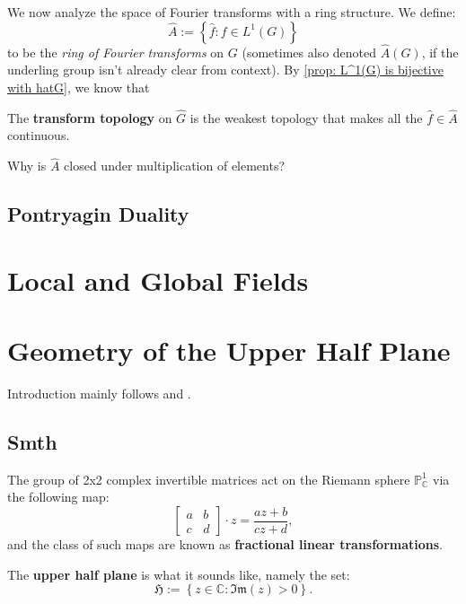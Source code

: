 \documentclass[11pt, x11names, openany]{book}
\newcommand{\cc}{\mathbb{C}}
\newcommand{\bp}{\mathbb{P}}
\newcommand{\frakh}{\mathfrak{H}}
\newcommand{\set}[1]{\left\{ #1 \right\}}
\renewcommand{\hat}{\widehat}
\newcommand{\im}[1]{\mathfrak{Im} \left( #1 \right)}
\begin{document}
We now analyze the space of Fourier transforms with a ring structure. We define:
\begin{equation*}
    \hat{A} := \set{\hat{f} : f \in L^1(G)}
\end{equation*}
to be the \textit{ring of Fourier transforms} on $G$ (sometimes also denoted $\hat{A}(G)$, if the underling group isn't already clear from context). By \ref{prop: L^1(G) is bijective with hatG}, we know that 
\begin{defn}
    The \textbf{transform topology} on $\hat{G}$ is the weakest topology that makes all the $\hat{f} \in \hat{A}$ continuous.
\end{defn}
\begin{sanitycheck}
    Why is $\hat{A}$ closed under multiplication of elements?
\end{sanitycheck}



\subsection{Pontryagin Duality}
\label{subsection: Pontryagin Duality}

\newpage
\section{Local and Global Fields}


\newpage
\section{Geometry of the Upper Half Plane}
Introduction mainly follows \cite{diamond2006first} and \cite{miyake2006modular}.

\subsection{Smth}

The group of 2x2 complex invertible matrices act on the Riemann sphere $\bp^1_\cc$ via the following map:
\begin{equation*}
    \begin{bmatrix}
        a & b\\ c & d
    \end{bmatrix} \cdot z = \frac{az + b}{cz + d},
\end{equation*}
and the class of such maps are known as \textbf{fractional linear transformations}.

\begin{defn}
\label{def: Upper half-plane}
The \textbf{upper half plane} is what it sounds like, namely the set:
\begin{equation*}
    \frakh := \set{z \in \cc : \im{z} > 0}.
\end{equation*}
\end{defn}
\end{document}
